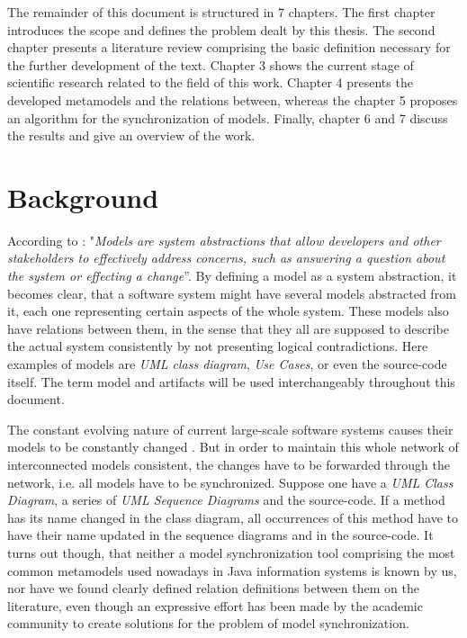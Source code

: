 \documentclass[tuberlin,cic,tc,english,noabntcite]{iiufrgs}
\begin{document}
The remainder of this document is structured in 7 chapters. The first chapter introduces the scope and defines the problem dealt by this thesis. The second chapter presents a literature review comprising the basic definition necessary for the further development of the text. Chapter 3 shows the current stage of scientific research related to the field of this work. Chapter 4 presents the developed metamodels and the relations between, whereas the chapter 5 proposes an algorithm for the synchronization of models. Finally, chapter 6 and 7 discuss the results and give an overview of the work.

\section{Background}
According to \citet[p. 21]{czarnecki2006feature}: "\textit{Models are system abstractions that allow developers and other stakeholders to effectively address concerns, such as answering a question about the system or effecting a change}”. By defining a model as a system abstraction, it becomes clear, that a software system might have several models abstracted from it, each one representing certain aspects of the whole system. These models also have relations between them, in the sense that they all are supposed to describe the actual system consistently by not presenting logical contradictions. Here examples of models are \emph{UML class diagram}, \emph{Use Cases}, or even the source-code itself. The term model and artifacts will be used interchangeably throughout this document.

The constant evolving nature of current large-scale software systems causes their models to be constantly changed \citep{diskin2011model}. But in order to maintain this whole network of interconnected models consistent, the changes have to be forwarded through the network, i.e. all models have to be synchronized. Suppose one have a \emph{UML Class Diagram}, a series of \emph{UML Sequence Diagrams} and the source-code. If a method has its name changed in the class diagram, all occurrences of this method have to have their name updated in the sequence diagrams and in the source-code. It turns out though, that neither a model synchronization tool comprising the most common metamodels used nowadays in Java information systems is known by us, nor have we found clearly defined relation definitions between them on the literature, even though an expressive effort has been made by the academic community to create solutions for the problem of model synchronization. 
\end{document}
